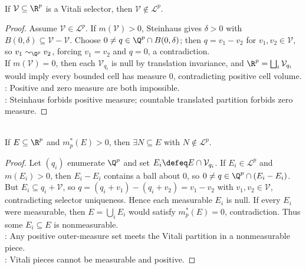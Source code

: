 \begin{theorem} \label{thm:vitali-selector-nonmeasurable} \\
If $\mathcal{V}\subseteq\R^p$ is a Vitali selector, then $\mathcal{V}\notin\mathcal{L}^p$.
\begin{proof}
Assume $\mathcal{V}\in\mathcal{L}^p$.
If $m(\mathcal{V})>0$, Steinhaus gives $\delta>0$ with $B(0,\delta)\subseteq\mathcal{V}-\mathcal{V}$. Choose $0\neq q\in\Q^p\cap B(0,\delta)$; then $q=v_1-v_2$ for $v_1,v_2\in\mathcal{V}$, so $v_1\sim_{\Q^p}v_2$, forcing $v_1=v_2$ and $q=0$, a contradiction.\\
If $m(\mathcal{V})=0$, then each $\mathcal{V}_{q_i}$ is null by translation invariance, and $\R^p=\bigsqcup_i\mathcal{V}_{q_i}$ would imply every bounded cell has measure $0$, contradicting positive cell volume.\\
: Positive and zero measure are both impossible.\\
: Steinhaus forbids positive measure; countable translated partition forbids zero measure.
\end{proof}
\end{theorem}

\begin{theorem} \label{thm:positive-outer-measure-contains-nonmeasurable-subset} \\
If $E\subseteq\R^p$ and $m_p^\ast(E)>0$, then $\exists N\subseteq E$ with $N\notin\mathcal{L}^p$.
\begin{proof}
Let $(q_i)$ enumerate $\Q^p$ and set $E_i\defeq E\cap\mathcal{V}_{q_i}$. If $E_i\in\mathcal{L}^p$ and $m(E_i)>0$, then $E_i-E_i$ contains a ball about $0$, so $0\neq q\in\Q^p\cap(E_i-E_i)$. But $E_i\subseteq q_i+\mathcal{V}$, so $q=(q_i+v_1)-(q_i+v_2)=v_1-v_2$ with $v_1,v_2\in\mathcal{V}$, contradicting selector uniqueness. Hence each measurable $E_i$ is null. If every $E_i$ were measurable, then $E=\bigcup_iE_i$ would satisfy $m_p^\ast(E)=0$, contradiction. Thus some $E_i\subseteq E$ is nonmeasurable.\\
: Any positive outer-measure set meets the Vitali partition in a nonmeasurable piece.\\
: Vitali pieces cannot be measurable and positive.
\end{proof}
\end{theorem}

